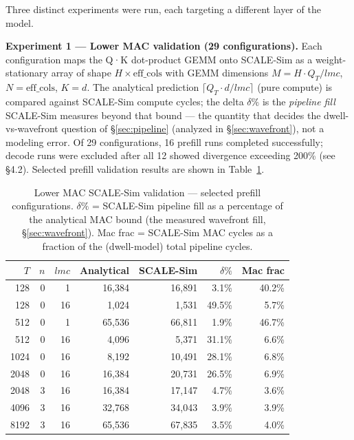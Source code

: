 \documentclass[11pt]{article}
\begin{document}
Three distinct experiments were run, each targeting a different
layer of the model.

\textbf{Experiment 1 --- Lower MAC validation (29 configurations).}
Each configuration maps the Q·K dot-product GEMM onto SCALE-Sim
as a weight-stationary array of shape \(H \times \text{eff\_cols}\)
with GEMM dimensions \(M = H \cdot Q_T / lmc\), \(N = \text{eff\_cols}\),
\(K = d\).
The analytical prediction \(\lceil Q_T \cdot d / lmc \rceil\) (pure compute)
is compared against SCALE-Sim compute cycles;
the delta \(\delta\%\) is the \emph{pipeline fill} SCALE-Sim measures beyond
that bound --- the quantity that decides the dwell-vs-wavefront question of
\S\ref{sec:pipeline} (analyzed in \S\ref{sec:wavefront}), not a modeling error.
Of 29 configurations, 16 prefill runs completed successfully;
decode runs were excluded after all 12 showed divergence exceeding
200\% (see \S4.2).
Selected prefill validation results are shown in
Table~\ref{tab:mac_validation}.

\begin{table}[H]
\centering
\caption{Lower MAC SCALE-Sim validation --- selected prefill configurations.
\(\delta\%\) = SCALE-Sim pipeline fill as a percentage of the analytical MAC
bound (the measured wavefront fill, \S\ref{sec:wavefront}).
Mac frac = SCALE-Sim MAC cycles as a fraction of the (dwell-model) total
pipeline cycles.}
\label{tab:mac_validation}
\begin{tabular}{rrrrrrr}
\toprule
\(T\) & \(n\) & \(lmc\) & Analytical & SCALE-Sim & \(\delta\%\) & Mac frac \\
\midrule
128  & 0 &  1 & 16,384 & 16,891 & 3.1\%  & 40.2\% \\
128  & 0 & 16 &  1,024 &  1,531 & 49.5\% &  5.7\% \\
512  & 0 &  1 & 65,536 & 66,811 & 1.9\%  & 46.7\% \\
512  & 0 & 16 &  4,096 &  5,371 & 31.1\% &  6.6\% \\
1024 & 0 & 16 &  8,192 & 10,491 & 28.1\% &  6.8\% \\
2048 & 0 & 16 & 16,384 & 20,731 & 26.5\% &  6.9\% \\
2048 & 3 & 16 & 16,384 & 17,147 &  4.7\% &  3.6\% \\
4096 & 3 & 16 & 32,768 & 34,043 &  3.9\% &  3.9\% \\
8192 & 3 & 16 & 65,536 & 67,835 &  3.5\% &  4.0\% \\
\bottomrule
\end{tabular}
\end{table}
\end{document}
